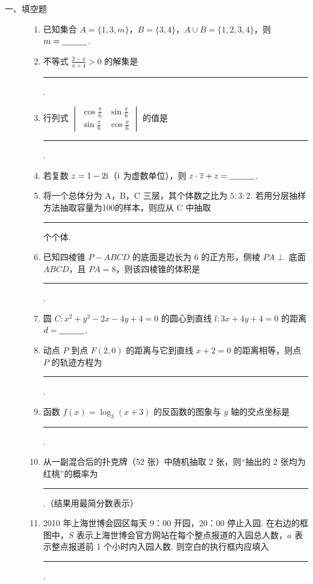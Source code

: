 \begin{description}

    \item[一、填空题]

    \begin{enumerate}[leftmargin=5pt]

        \item 已知集合 \(A = \{1, 3, m\}\)，\(B = \{3, 4\}\)，\(A \cup B = \{1, 2, 3, 4\}\)，则 \(m =\rule[-0.3ex]{3em}{0.4pt}\).

        \item 不等式 \(\frac{2 - x}{x + 4} > 0\) 的解集是\rule[-0.3ex]{3em}{0.4pt}.

        \item 行列式 \(\begin{vmatrix} \cos \frac{\pi}{6} & \sin \frac{\pi}{6} \\ \sin \frac{\pi}{6} & \cos \frac{\pi}{6} \end{vmatrix}\) 的值是\rule[-0.3ex]{3em}{0.4pt}.

        \item 若复数 \(z = 1 - 2\mathrm{i}\)（\(\mathrm{i}\) 为虚数单位），则 \(z \cdot \overline{z} + z =\rule[-0.3ex]{3em}{0.4pt}\).

        \item 将一个总体分为 A，B，C 三层，其个体数之比为 \(5:3:2\). 若用分层抽样方法抽取容量为100的样本，则应从 C 中抽取\rule[-0.3ex]{3em}{0.4pt} 个个体.

        \item 已知四棱锥 \(P - ABCD\) 的底面是边长为 6 的正方形，侧棱 \(PA \perp\) 底面 \(ABCD\)，且 \(PA = 8\)，则该四棱锥的体积是\rule[-0.3ex]{3em}{0.4pt}.

        \item 圆 \(C: x^{2} + y^{2} - 2x - 4y + 4 = 0\) 的圆心到直线 \(l: 3x + 4y + 4 = 0\) 的距离 \(d =\rule[-0.3ex]{3em}{0.4pt}\).

        \item 动点 \(P\) 到点 \(F(2,0)\) 的距离与它到直线 \(x + 2 = 0\) 的距离相等，则点 \(P\) 的轨迹方程为\rule[-0.3ex]{3em}{0.4pt}.

        \item 函数 \( f(x) = \log_3(x + 3) \) 的反函数的图象与 \( y \) 轴的交点坐标是\rule[-0.3ex]{3em}{0.4pt}.

        \item 从一副混合后的扑克牌（52 张）中随机抽取 2 张，则“抽出的 2 张均为红桃”的概率为\rule[-0.3ex]{3em}{0.4pt}.（结果用最简分数表示）

        \item 2010 年上海世博会园区每天 9：00 开园，20：00 停止入园. 在右边的框图中，\(S\) 表示上海世博会官方网站在每个整点报道的入园总人数，\(a\) 表示整点报道前 1 个小时内入园人数. 则空白的执行框内应填入\rule[-0.3ex]{3em}{0.4pt}.


\end{enumerate}
\end{description}
